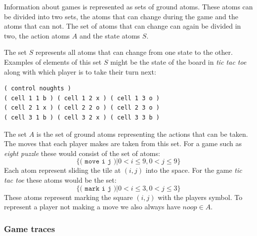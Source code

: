 Information about games is represented as sets of ground atoms. These atoms can be divided into two sets, the atoms that can change during the game and the atoms that can not. The set of atoms that can change can again be divided in two, the action atoms $A$ and the state atoms $S$.

The set $S$ represents all atoms that can change from one state to the other. Examples of elements of this set $S$ might be the state of the board in \textit{tic tac toe} along with which player is to take their turn next:
\begin{verbatim}
( control noughts )
( cell 1 1 b ) ( cell 1 2 x ) ( cell 1 3 o )
( cell 2 1 x ) ( cell 2 2 o ) ( cell 2 3 o )
( cell 3 1 b ) ( cell 3 2 x ) ( cell 3 3 b )
\end{verbatim}

The set $A$ is the set of ground atoms representing the actions that can be taken. The moves that each player makes are taken from this set. For a game such as \textit{eight puzzle} these would consist of the set of atoms:
\[\{\texttt{( move i j )}| 0<i\leq 9, 0<j\leq 9\}\]
Each atom represent sliding the tile at $(i,j)$ into the space. For the game \textit{tic tac toe} these atoms would be the set:
\[\{\texttt{( mark i j )}|0<i\leq 3, 0<j\leq 3\}\]
These atoms represent marking the square $(i,j)$ with the players symbol. To represent a player not making a move we also always have $noop \in A$.

\subsubsection{Game traces}

